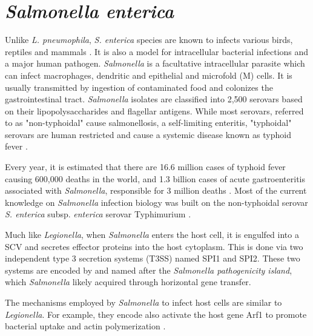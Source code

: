\section{\textit{Salmonella enterica}}

Unlike \textit{L. pneumophila}, \textit{S. enterica} species are known to infects various birds, reptiles and mammals \cite{Uzzau2000}. It is also a model for intracellular bacterial infections and a major human pathogen. \textit{Salmonella} is a facultative intracellular parasite which can infect macrophages, dendritic and epithelial and microfold (M) cells. It is usually transmitted by ingestion of contaminated food and colonizes the gastrointestinal tract. \textit{Salmonella} isolates are classified into 2,500 serovars based on their lipopolysaccharides and flagellar antigens. While most serovars, referred to as "non-typhoidal" cause salmonellosis, a self-limiting enteritis, "typhoidal" serovars are human restricted and cause a systemic disease known as typhoid fever \cite{Larock2015}.

Every year, it is estimated that there are 16.6 million cases of typhoid fever causing 600,000 deaths in the world, and 1.3 billion cases of acute gastroenteritis associated with \textit{Salmonella}, responsible for 3 million deaths \cite{Pang1995}. Most of the current knowledge on \textit{Salmonella} infection biology was built on the non-typhoidal serovar \textit{S. enterica} subsp. \textit{enterica} serovar Typhimurium \cite{Larock2015}. 

Much like \textit{Legionella}, when \textit{Salmonella} enters the host cell, it is engulfed into a \acrfull{SCV}  and secretes effector proteins into the host cytoplasm. This is done via two independent type 3 secretion systems (T3SS) named SPI1 and SPI2. These two systems are encoded by and named after the \textit{Salmonella pathogenicity island}, which \textit{Salmonella} likely acquired through horizontal gene transfer.

The mechanisms employed by \textit{Salmonella} to infect host cells are similar to \textit{Legionella}. For example, they encode also activate the host gene Arf1 to promote bacterial uptake and actin polymerization \cite{Larock2015}.
